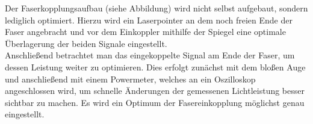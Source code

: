 
Der Faserkopplungsaufbau (siehe Abbildung) wird nicht selbst aufgebaut, sondern lediglich optimiert. Hierzu wird ein Laserpointer an dem noch freien Ende der Faser angebracht und vor dem Einkoppler mithilfe der Spiegel eine optimale Überlagerung der beiden Signale eingestellt. \\
Anschließend betrachtet man das eingekoppelte Signal am Ende der Faser, um dessen Leistung weiter zu optimieren. Dies erfolgt zunächst mit dem bloßen Auge und anschließend mit einem Powermeter, welches an ein Oszilloskop angeschlossen wird, um schnelle Änderungen der gemessenen Lichtleistung besser sichtbar zu machen. Es wird ein Optimum der Fasereinkopplung möglichst genau eingestellt. 



